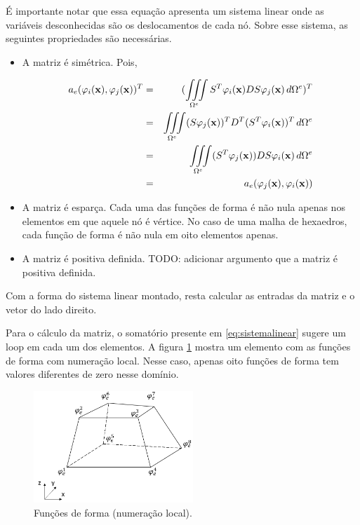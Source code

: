 É importante notar que essa equação apresenta um sistema linear onde as variáveis desconhecidas são os deslocamentos de cada nó. Sobre esse sistema, as seguintes propriedades são necessárias.

\begin{itemize}
    \item A matriz é simétrica. Pois,

    \begin{eqnarray}
    a_e(\varphi_i(\mathbf{x}),\varphi_j(\mathbf{x}))^T & = & (\iiint\limits_{\Omega^e} S^T\varphi_i(\mathbf{x}) D S\varphi_j(\mathbf{x}) \, d\Omega^e)^T \\
                         & = & \iiint\limits_{\Omega^e} (S\varphi_j(\mathbf{x}))^T D^T (S^T\varphi_i(\mathbf{x}))^T \, d\Omega^e \\
                         & = & \iiint\limits_{\Omega^e} (S^T\varphi_j(\mathbf{x})) D S \varphi_i(\mathbf{x}) \, d\Omega^e \\
                         & = & a_e(\varphi_j(\mathbf{x}),\varphi_i(\mathbf{x}))
    \end{eqnarray}

    \item A matriz é esparça. Cada uma das funções de forma é não nula apenas nos elementos em que aquele nó é vértice. No caso de uma malha de hexaedros, cada função de forma é não nula em oito elementos apenas.

    \item A matriz é positiva definida. {\color{red}TODO: adicionar argumento que a matriz é positiva definida.}
\end{itemize}

Com a forma do sistema linear montado, resta calcular as entradas da matriz e o vetor do lado direito.

Para o cálculo da matriz, o somatório presente em \ref{eq:sistemalinear} sugere um loop em cada um dos elementos. A figura \ref{fig:elem_func_form_local} mostra um elemento com as funções de forma com numeração local. Nesse caso, apenas oito funções de forma tem valores diferentes de zero nesse domínio.

\begin{figure}[!htbp]
\centering
\includegraphics[width=6cm]{chap01/elemento_original_func_forma.png}
\caption{Funções de forma (numeração local).}
\label{fig:elem_func_form_local}
\end{figure}


